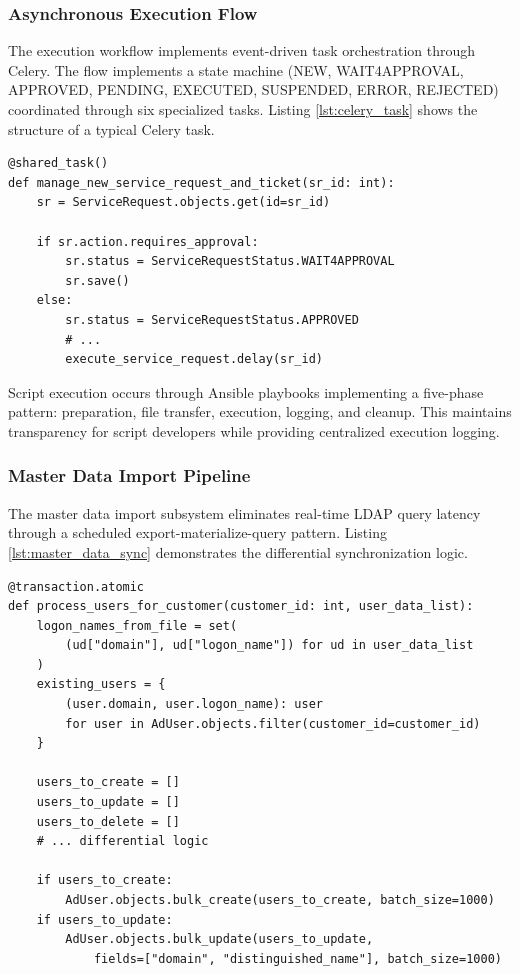 \subsubsection{Asynchronous Execution Flow}

The execution workflow implements event-driven task orchestration through Celery. The flow implements a state machine (NEW, WAIT4APPROVAL, APPROVED, PENDING, EXECUTED, SUSPENDED, ERROR, REJECTED) coordinated through six specialized tasks. Listing \ref{lst:celery_task} shows the structure of a typical Celery task.

\begin{listing}[htbp]
\begin{verbatim}
@shared_task()
def manage_new_service_request_and_ticket(sr_id: int):
    sr = ServiceRequest.objects.get(id=sr_id)
    
    if sr.action.requires_approval:
        sr.status = ServiceRequestStatus.WAIT4APPROVAL
        sr.save()
    else:
        sr.status = ServiceRequestStatus.APPROVED
        # ...
        execute_service_request.delay(sr_id)
\end{verbatim}
\caption{Celery Task for Service Request State Management}
\label{lst:celery_task}
\end{listing}

Script execution occurs through Ansible playbooks implementing a five-phase pattern: preparation, file transfer, execution, logging, and cleanup. This maintains transparency for script developers while providing centralized execution logging.

\subsubsection{Master Data Import Pipeline}

The master data import subsystem eliminates real-time LDAP query latency through a scheduled export-materialize-query pattern. Listing \ref{lst:master_data_sync} demonstrates the differential synchronization logic.

\begin{listing}[htbp]
\begin{verbatim}
@transaction.atomic
def process_users_for_customer(customer_id: int, user_data_list):
    logon_names_from_file = set(
        (ud["domain"], ud["logon_name"]) for ud in user_data_list
    )
    existing_users = {
        (user.domain, user.logon_name): user
        for user in AdUser.objects.filter(customer_id=customer_id)
    }
    
    users_to_create = []
    users_to_update = []
    users_to_delete = []
    # ... differential logic
    
    if users_to_create:
        AdUser.objects.bulk_create(users_to_create, batch_size=1000)
    if users_to_update:
        AdUser.objects.bulk_update(users_to_update, 
            fields=["domain", "distinguished_name"], batch_size=1000)
\end{verbatim}
\caption{Differential Synchronization for Master Data Import}
\label{lst:master_data_sync}
\end{listing}

